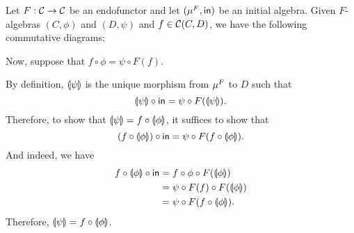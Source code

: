 \begin{solution}\label{sol:fusion-property}
	Let $ F : \mathcal{C} \to \mathcal{C} $ be an endofunctor and let $ (\mu^{F}, \mathsf{in}) $ be an initial algebra. Given $F$-algebras $(C,\phi)$ and $(D,\psi)$ and $ f \in {\mathcal{C}}(C,D) $, we have the following commutative diagrams:
	\begin{center}
		\quad
	\end{center}
	Now, suppose that $ f \circ \phi = \psi \circ F(f) $.

	By definition, $ \llparenthesis \psi \rrparenthesis $ is the unique morphism from $ \mu^{F} $ to $ D $ such that 
	\[ \llparenthesis \psi \rrparenthesis \circ \mathsf{in} = \psi \circ F(\llparenthesis \psi \rrparenthesis). \]
	Therefore, to show that $ \llparenthesis \psi \rrparenthesis = f \circ \llparenthesis \phi \rrparenthesis $, it suffices to show that
	\[ (f \circ \llparenthesis \phi \rrparenthesis) \circ \mathsf{in} = \psi \circ F(f \circ \llparenthesis \phi \rrparenthesis). \]
	And indeed, we have
	\begin{align*}
		f \circ \llparenthesis \phi \rrparenthesis \circ \mathsf{in} &= f \circ \phi \circ F(\llparenthesis \phi \rrparenthesis)\\
		&= \psi \circ F(f) \circ F(\llparenthesis \phi \rrparenthesis)\\
		&= \psi \circ F(f \circ \llparenthesis \phi \rrparenthesis).
	\end{align*}
	Therefore, $ \llparenthesis \psi \rrparenthesis = f \circ \llparenthesis \phi \rrparenthesis $.
\end{solution}

